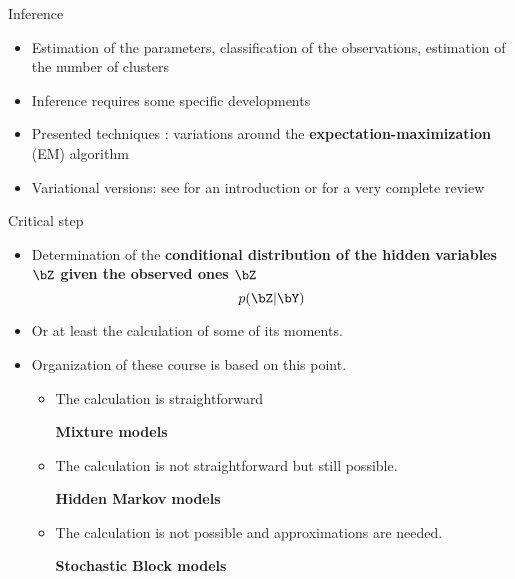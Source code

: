 \documentclass[compress,10pt]{beamer}
\begin{document}
\begin{frame}{Inference}
 \begin{itemize}
 \item Estimation of the parameters, classification of the observations, estimation of the number of clusters 
  \item Inference  requires some specific developments
  \item Presented techniques : variations
around the \textbf{expectation-maximization} (EM) algorithm  \cite{dempster77}
\item Variational versions:  see \cite{Jaakkola00} for an
introduction or \cite{Wainwright08} for a very complete review
 \end{itemize}
 
\end{frame}

\begin{frame}{Critical step}
 
 \begin{itemize}
  \item Determination of the \textbf{conditional distribution
of the hidden variables $\bZ$ given the observed ones $\bZ$}
$$p(\bZ | \bY)$$
\item Or at least the calculation of some of its moments.
\item Organization of these course is based on this point. 

\begin{itemize}
\item  The calculation  is
straightforward 

\begin{center}
\textbf{\color{dgreen}  Mixture models}
\end{center}
\item  The calculation is not straightforward but still possible. 
\begin{center}
\textbf{\color{dgreen} Hidden Markov models}
\end{center}
 
\item The  calculation is not possible and approximations are needed.  

\begin{center}
\textbf{\color{dgreen}  Stochastic Block models}
\end{center}

\end{itemize}
\end{itemize}

\end{frame}
\end{document}
